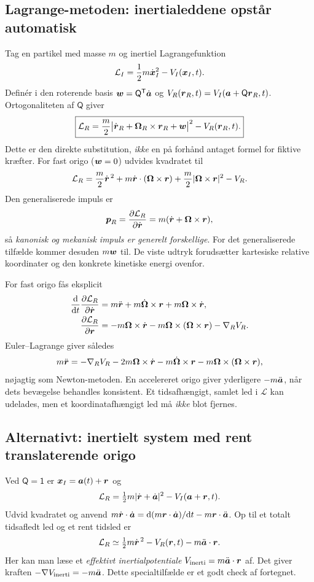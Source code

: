 \subsection{Lagrange-metoden: inertialeddene opstår automatisk}\label{sec:lagrot}
Tag en partikel med masse $m$ og inertiel Lagrangefunktion
\[
\mathcal L_I=\frac12m\dot{\boldsymbol{x}}_I^2-V_I(\boldsymbol{x}_I,t).
\]
Definér i den roterende basis $\boldsymbol{w}=\mathsf Q^{\mathsf T}\dot{\boldsymbol{a}}$ og $V_R(\boldsymbol{r}_R,t)=V_I(\boldsymbol{a}+\mathsf Q\boldsymbol{r}_R,t)$. Ortogonaliteten af $\mathsf Q$ giver
\[
\boxed{\mathcal L_R
=\frac m2\bigl|\dot{\boldsymbol{r}}_R+\boldsymbol{\Omega}_R\times\boldsymbol{r}_R+\boldsymbol{w}\bigr|^2
-V_R(\boldsymbol{r}_R,t).}
\]
Dette er den direkte substitution, \emph{ikke} en på forhånd antaget formel for fiktive kræfter. For fast origo ($\boldsymbol{w}=0$) udvides kvadratet til
\[
\mathcal L_R
=\frac m2\dot{\boldsymbol{r}}^{\,2}
+m\dot{\boldsymbol{r}}\cdot(\boldsymbol{\Omega}\times\boldsymbol{r})
+\frac m2|\boldsymbol{\Omega}\times\boldsymbol{r}|^2-V_R.
\]
Den generaliserede impuls er
\[
\boldsymbol{p}_R=\frac{\partial\mathcal L_R}{\partial\dot{\boldsymbol{r}}}
=m(\dot{\boldsymbol{r}}+\boldsymbol{\Omega}\times\boldsymbol{r}),
\]
så \emph{kanonisk og mekanisk impuls er generelt forskellige}. For det generaliserede tilfælde kommer desuden $m\boldsymbol{w}$ til. De viste udtryk forudsætter kartesiske relative koordinater og den konkrete kinetiske energi ovenfor.

For fast origo fås eksplicit
\begin{align*}
\frac{\mathrm d}{\mathrm d t}\frac{\partial\mathcal L_R}{\partial\dot{\boldsymbol{r}}}
&=m\ddot{\boldsymbol{r}}+m\dot{\boldsymbol{\Omega}}\times\boldsymbol{r}
+m\boldsymbol{\Omega}\times\dot{\boldsymbol{r}},\\
\frac{\partial\mathcal L_R}{\partial\boldsymbol{r}}
&=-m\boldsymbol{\Omega}\times\dot{\boldsymbol{r}}
-m\boldsymbol{\Omega}\times(\boldsymbol{\Omega}\times\boldsymbol{r})-\nabla_R V_R.
\end{align*}
Euler--Lagrange giver således
\[
m\ddot{\boldsymbol{r}}=-\nabla_R V_R
-2m\boldsymbol{\Omega}\times\dot{\boldsymbol{r}}
-m\dot{\boldsymbol{\Omega}}\times\boldsymbol{r}
-m\boldsymbol{\Omega}\times(\boldsymbol{\Omega}\times\boldsymbol{r}),
\]
nøjagtig som Newton-metoden. En accelereret origo giver yderligere $-m\ddot{\boldsymbol{a}}$, når dets bevægelse behandles konsistent. Et tidsafhængigt, samlet led i $\mathcal L$ kan udelades, men et koordinatafhængigt led må \emph{ikke} blot fjernes.

\subsection{Alternativt: inertielt system med rent translaterende origo}
Ved $\mathsf Q=\mathsf 1$ er $\boldsymbol{x}_I=\boldsymbol{a}(t)+\boldsymbol{r}$ og
\[
\mathcal L_R=\tfrac12m|\dot{\boldsymbol{r}}+\dot{\boldsymbol{a}}|^2-V_I(\boldsymbol{a}+\boldsymbol{r},t).
\]
Udvid kvadratet og anvend
$m\dot{\boldsymbol{r}}\cdot\dot{\boldsymbol{a}}
=\mathrm d(m\boldsymbol{r}\cdot\dot{\boldsymbol{a}})/\mathrm d t-m\boldsymbol{r}\cdot\ddot{\boldsymbol{a}}$.
Op til et totalt tidsafledt led og et rent tidsled er
\[
\mathcal L_R\simeq \tfrac12m\dot{\boldsymbol{r}}^{\,2}
-V_R(\boldsymbol{r},t)-m\ddot{\boldsymbol{a}}\cdot\boldsymbol{r}.
\]
Her kan man læse et \emph{effektivt inertialpotentiale} $V_{\rm inerti}=m\ddot{\boldsymbol{a}}\cdot\boldsymbol{r}$ af. Det giver kraften $-\nabla V_{\rm inerti}=-m\ddot{\boldsymbol{a}}$. Dette specialtilfælde er et godt check af fortegnet.

